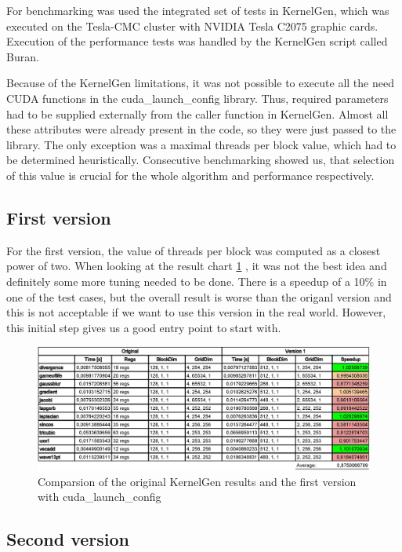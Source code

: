 \documentclass{usiinftr}
\begin{document}
For benchmarking was used the integrated set of tests in KernelGen, which was executed on the Tesla-CMC cluster with {NVIDIA} Tesla C2075 graphic cards. Execution of the performance tests was handled by the KernelGen script called Buran.

Because of the KernelGen limitations, it was not possible to execute all the need CUDA functions in the cuda\_launch\_config library. Thus, required parameters had to be supplied externally from the caller function in KernelGen. Almost all these attributes were already present in the code, so they were just passed to the library. The only exception was a maximal threads per block value, which had to be determined heuristically. Consecutive benchmarking showed us, that selection of this value is crucial for the whole algorithm and performance respectively.

\subsection{First version}

For the first version, the value of threads per block was computed as a closest power of two. When looking at the result chart \ref{fig:clc1} , it was not the best idea and definitely some more tuning needed to be done. There is a speedup of a 10\% in one of the test cases, but the overall result is worse than the origanl version and this is not acceptable if we want to use this version in the real world. However, this initial step gives us a good entry point to start with.

\begin{figure}[H]
\begin{center}
  \includegraphics[width=1\textwidth]{figures/kernelgen_v1}
  \caption{Comparsion of the original KernelGen results and the first version with cuda\_launch\_config  \label{fig:clc1}}  
\end{center}
\end{figure}

\subsection{Second version}
\end{document}
